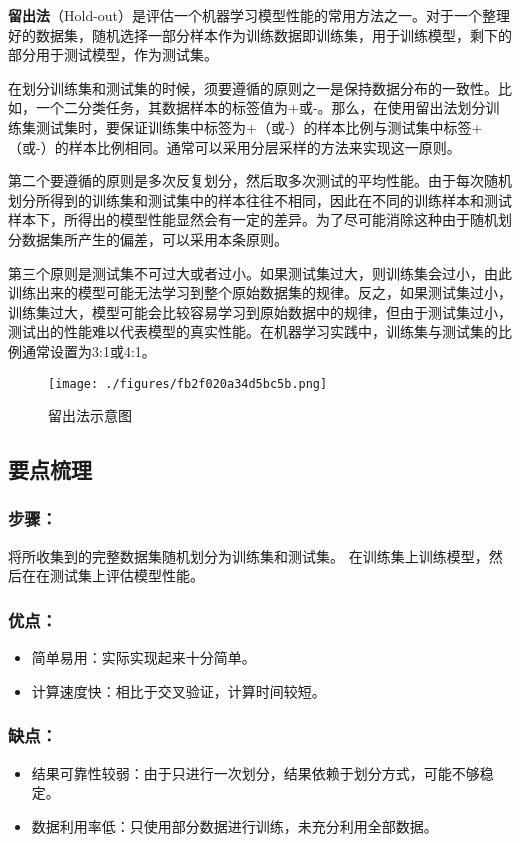 

\textbf{留出法}（Hold-out）是评估一个机器学习模型性能的常用方法之一。对于一个整理好的数据集，随机选择一部分样本作为训练数据即训练集，用于训练模型，剩下的部分用于测试模型，作为测试集。

在划分训练集和测试集的时候，须要遵循的原则之一是保持数据分布的一致性。比如，一个二分类任务，其数据样本的标签值为+或-。那么，在使用留出法划分训练集测试集时，要保证训练集中标签为+（或-）的样本比例与测试集中标签+（或-）的样本比例相同。通常可以采用分层采样的方法来实现这一原则。

第二个要遵循的原则是多次反复划分，然后取多次测试的平均性能。由于每次随机划分所得到的训练集和测试集中的样本往往不相同，因此在不同的训练样本和测试样本下，所得出的模型性能显然会有一定的差异。为了尽可能消除这种由于随机划分数据集所产生的偏差，可以采用本条原则。

第三个原则是测试集不可过大或者过小。如果测试集过大，则训练集会过小，由此训练出来的模型可能无法学习到整个原始数据集的规律。反之，如果测试集过小，训练集过大，模型可能会比较容易学习到原始数据中的规律，但由于测试集过小，测试出的性能难以代表模型的真实性能。在机器学习实践中，训练集与测试集的比例通常设置为3:1或4:1。


\begin{figure}[ht]
\centering
\texttt{[image: ./figures/fb2f020a34d5bc5b.png]}
\caption{留出法示意图} \label{fig_holdou_1}
\end{figure}


\subsection{要点梳理}
\subsubsection{步骤：}
将所收集到的完整数据集随机划分为训练集和测试集。
在训练集上训练模型，然后在在测试集上评估模型性能。

\subsubsection{优点：}
\begin{itemize}
\item 简单易用：实际实现起来十分简单。
\item 计算速度快：相比于交叉验证，计算时间较短。
\end{itemize}

\subsubsection{缺点：}
\begin{itemize}
\item 结果可靠性较弱：由于只进行一次划分，结果依赖于划分方式，可能不够稳定。
\item 数据利用率低：只使用部分数据进行训练，未充分利用全部数据。
\end{itemize}